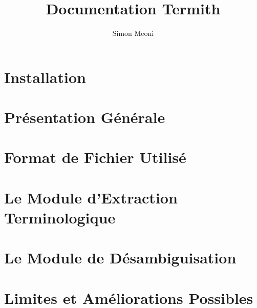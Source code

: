 \documentclass[10pt,a4paper]{report}
\title{Documentation Termith}
\author{Simon Meoni}
\begin{document}
\maketitle
\thispagestyle{empty}
\clearpage
\setcounter{page}{1}
\newpage
{
\hypersetup{hidelinks}
\tableofcontents
}
\newpage
\listoffigures
\newpage
\listoftables
\newpage
{}
\chapter{Installation}
\label{chap:installation}


\chapter{Présentation Générale}
\label{chap:presentation}


\chapter{Format de Fichier Utilisé}
\label{chap:format}


\chapter{Le Module d'Extraction Terminologique}
\label{chap:terminologie}


\chapter{Le Module de Désambiguisation}
\label{chap:desamb}


\chapter{Limites et Améliorations Possibles}
\label{chap:limite}

\end{document}
